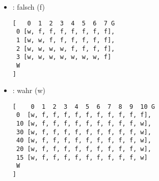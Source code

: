 \documentclass{bschlangaul-aufgabe}
\begin{document}
\begin{enumerate}
\begin{bAdditum}
\begin{itemize}
\begin{verbatim}
[
  [w, f, f, f],
  [w, w, f, f],
  [w, w, w, w],
  [w, w, w, w]
]
\end{verbatim}

\item {}: falsch (f)

\begin{verbatim}
[   0  1  2  3  4  5  6  7 G
 0 [w, f, f, f, f, f, f, f],
 1 [w, w, f, f, f, f, f, f],
 2 [w, w, w, w, f, f, f, f],
 3 [w, w, w, w, w, w, w, f]
 W
]
\end{verbatim}

\item {}: wahr (w)

\begin{verbatim}
[    0  1  2  3  4  5  6  7  8  9  10 G
 0  [w, f, f, f, f, f, f, f, f, f, f],
 10 [w, f, f, f, f, f, f, f, f, f, w],
 30 [w, f, f, f, f, f, f, f, f, f, w],
 40 [w, f, f, f, f, f, f, f, f, f, w],
 20 [w, f, f, f, f, f, f, f, f, f, w],
 15 [w, f, f, f, f, f, f, f, f, f, w]
 W
]
\end{verbatim}
\end{itemize}

\end{bAdditum}
\end{enumerate}
\end{document}
